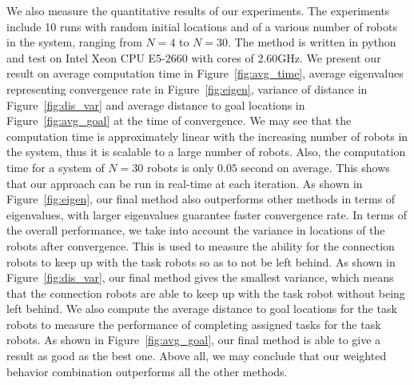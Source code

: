 \documentclass[../main.tex]{subfiles}
\begin{document}
We also measure the quantitative results of our experiments. The experiments include 10 runs with random initial locations and of a various number of robots in the system, ranging from $N=4$ to $N=30$. The method is written in python and test on Intel Xeon CPU E5-2660 with cores of 2.60GHz. We present our result on average computation time in Figure~\ref{fig:avg_time}, average eigenvalues representing convergence rate in Figure~\ref{fig:eigen}, variance of distance in Figure~\ref{fig:dis_var} and average distance to goal locations in Figure~\ref{fig:avg_goal} at the time of convergence. We may see that the computation time is approximately linear with the increasing number of robots in the system, thus it is scalable to a large number of robots. Also, the computation time for a system of $N=30$ robots is only $0.05$ second on average. This shows that our approach can be run in real-time at each iteration. As shown in Figure~\ref{fig:eigen}, our final method also outperforms other methods in terms of eigenvalues, with larger eigenvalues guarantee faster convergence rate. In terms of the overall performance, we take into account the variance in locations of the robots after convergence. This is used to measure the ability for the connection robots to keep up with the task robots so as to not be left behind. As shown in Figure~\ref{fig:dis_var}, our final method gives the smallest variance, which means that the connection robots are able to keep up with the task robot without being left behind. We also compute the average distance to goal locations for the task robots to measure the performance of completing assigned tasks for the task robots. As shown in Figure~\ref{fig:avg_goal}, our final method is able to give a result as good as the best one. Above all, we may conclude that our weighted behavior combination outperforms all the other methods.
\end{document}
